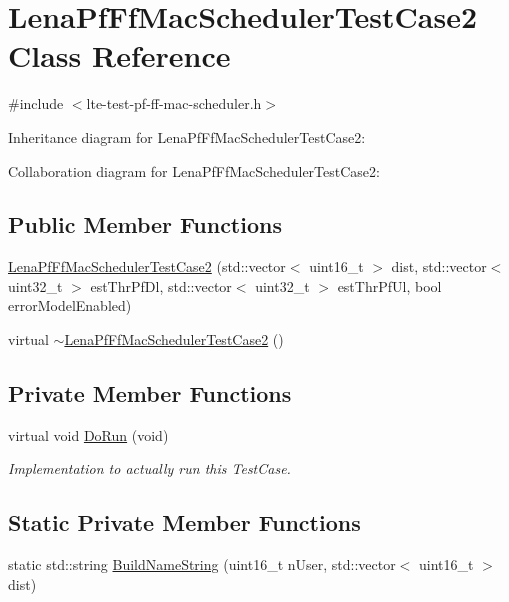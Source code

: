 \hypertarget{classLenaPfFfMacSchedulerTestCase2}{}\section{Lena\+Pf\+Ff\+Mac\+Scheduler\+Test\+Case2 Class Reference}
\label{classLenaPfFfMacSchedulerTestCase2}


{\ttfamily \#include $<$lte-\/test-\/pf-\/ff-\/mac-\/scheduler.\+h$>$}



Inheritance diagram for Lena\+Pf\+Ff\+Mac\+Scheduler\+Test\+Case2\+:


Collaboration diagram for Lena\+Pf\+Ff\+Mac\+Scheduler\+Test\+Case2\+:
\subsection*{Public Member Functions}
\begin{DoxyCompactItemize}
\item 
\hyperlink{classLenaPfFfMacSchedulerTestCase2_a0f28ba838087c2ba9c213329e90209f0}{Lena\+Pf\+Ff\+Mac\+Scheduler\+Test\+Case2} (std\+::vector$<$ uint16\+\_\+t $>$ dist, std\+::vector$<$ uint32\+\_\+t $>$ est\+Thr\+Pf\+Dl, std\+::vector$<$ uint32\+\_\+t $>$ est\+Thr\+Pf\+Ul, bool error\+Model\+Enabled)
\item 
virtual \hyperlink{classLenaPfFfMacSchedulerTestCase2_aba7b6edd27c8f09ede44e43f5240ae3c}{$\sim$\+Lena\+Pf\+Ff\+Mac\+Scheduler\+Test\+Case2} ()
\end{DoxyCompactItemize}
\subsection*{Private Member Functions}
\begin{DoxyCompactItemize}
\item 
virtual void \hyperlink{classLenaPfFfMacSchedulerTestCase2_a693c0eff7472d9b3bb12f1f95e46253b}{Do\+Run} (void)
\begin{DoxyCompactList}\small\item\em Implementation to actually run this Test\+Case. \end{DoxyCompactList}\end{DoxyCompactItemize}
\subsection*{Static Private Member Functions}
\begin{DoxyCompactItemize}
\item 
static std\+::string \hyperlink{classLenaPfFfMacSchedulerTestCase2_a8b287bb9f6d8c26a762cd448c766923d}{Build\+Name\+String} (uint16\+\_\+t n\+User, std\+::vector$<$ uint16\+\_\+t $>$ dist)
\end{DoxyCompactItemize}

